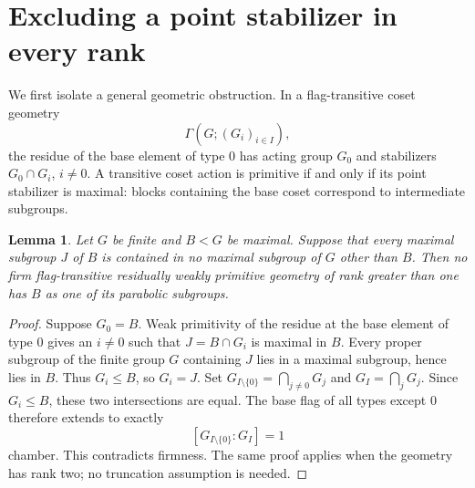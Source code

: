 \documentclass[11pt,a4paper]{article}
\newtheorem{lemma}[theorem]{Lemma}
\begin{document}
\section{Excluding a point stabilizer in every rank}
We first isolate a general geometric obstruction. In a flag-transitive
coset geometry
\[\Gamma(G;(G_i)_{i\in I}),\]
the residue of the base element of type $0$ has acting group $G_0$ and stabilizers
$G_0\cap G_i$, $i\ne0$. A transitive coset action is primitive
if and only if its point stabilizer is maximal: blocks containing
the base coset correspond to intermediate subgroups.

\begin{lemma}\label{terminal}
Let $G$ be finite and $B<G$ be maximal. Suppose that every maximal subgroup $J$ of
$B$ is contained in no maximal subgroup of $G$ other than $B$.
Then no firm flag-transitive residually weakly primitive geometry
of rank greater than one has $B$ as one of its parabolic subgroups.
\end{lemma}
\begin{proof}
Suppose $G_0=B$. Weak primitivity of the residue at the base
element of type $0$ gives an $i\ne0$ such that
$J=B\cap G_i$ is maximal in $B$. Every proper subgroup of the
finite group $G$ containing $J$ lies in a maximal subgroup, hence
lies in $B$. Thus $G_i\le B$, so $G_i=J$.
Set $G_{I\setminus\{0\}}=\bigcap_{j\ne0}G_j$ and
$G_I=\bigcap_jG_j$. Since $G_i\le B$, these two intersections
are equal. The base flag of all types except $0$ therefore extends
to exactly
\[
             [G_{I\setminus\{0\}}:G_I]=1
\]
chamber. This contradicts firmness. The same proof applies when
the geometry has rank two; no truncation assumption is needed.
\end{proof}
\end{document}
